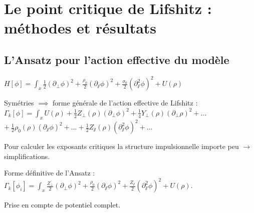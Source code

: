 \documentclass[xcolor=dvipsnames]{beamer}
\newcommand{\p}[1]{\partial_{#1}}
\begin{document}
\section{Le point critique de Lifshitz : méthodes et résultats}
\subsection{L'Ansatz pour l'action effective du modèle}
\begin{frame}

\centering
$ H[\phi] = \int_x  \frac{1}{2}(\p{\perp} \phi)^2 + \frac{\rho_0}{2}(\p{\sslash} \phi)^2 + \frac{\sigma_0}{2} (\p{\sslash}^2 \phi)^2 + U(\rho)$

\begin{block}{Symétries $\implies$ forme générale de l'action effective de Lifshitz :}
$\Gamma_k[\phi] = \int_{x} U(\rho) + \frac{1}{2} Z_\perp(\rho) (\partial_\perp \phi)^2 + \frac{1}{4} Y_\perp(\rho) (\partial_\perp \rho)^2 + ... $\\
\hfill$+~ \frac{1}{2} \rho_0(\rho) (\partial_\sslash \phi)^2 + ...  +  \frac{1}{2} Z_\sslash(\rho) (\partial_\sslash^2 \phi)^2 + ... $
\end{block}

Pour calculer les exposants critiques la structure impulsionnelle importe peu $\rightarrow$ simplifications.

\begin{block}{Forme définitive de l'Ansatz :}
$\Gamma_k[\phi_i] = \int_x  \frac{Z_\perp}{2} (\partial_\perp \phi)^2 + \frac{\rho_0}{2} (\partial_\sslash \phi)^2 + \frac{Z_\sslash}{2} (\partial_\sslash^2 \phi)^2 + U(\rho).$
\end{block}

Prise en compte de \textcolor{BrickRed}{potentiel complet}.
\end{frame}
\end{document}
